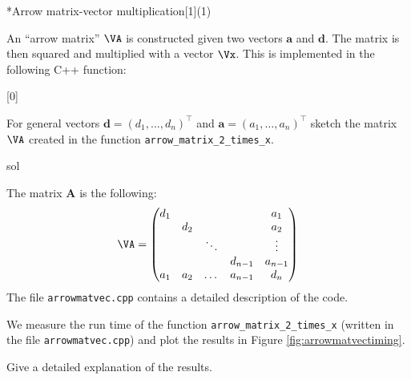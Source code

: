 
\begin{samproblem}*{}{Arrow matrix-vector multiplication}[1](1){
    An ``arrow matrix'' $\VA$ is constructed given two vectors $\mathbf{a}$ and $\mathbf{d}$.
    The matrix is then squared and multiplied with a vector $\Vx$. This is implemented in the
    following C++ function:

[0]

}

\begin{subproblem}{}

  For general vectors $\mathbf{d} = (d_1, \dots, d_n)^\top$ and $\mathbf{a} = (a_1, \dots, a_n)^\top$
  sketch the matrix $\VA$ created in the function \verb|arrow_matrix_2_times_x|.

  \begin{samwriteprbpart}{sol}
  \begin{samsolution}
    The matrix $\mathbf{A}$ is the following:
    \begin{align}
    \VA=\begin{pmatrix}
      d_1 &     &        &         & a_1     \\
          & d_2 &        &         & a_2     \\
          &     & \ddots &         & \vdots  \\
          &     &        & d_{n-1} & a_{n-1} \\
      a_1 & a_2 & \dots  & a_{n-1} & d_n     \\
    \end{pmatrix}
    \end{align}
    The file \texttt{arrowmatvec.cpp} contains a detailed description of the code.
  \end{samsolution}
\end{samwriteprbpart}
\end{subproblem}

\begin{subproblem}{}
  We measure the run time of the function \verb|arrow_matrix_2_times_x| (written in the
  file \texttt{arrowmatvec.cpp})
  and plot the results in Figure \ref{fig:arrowmatvectiming}.

  Give a detailed explanation of the results.



\end{subproblem}
\end{samproblem}
